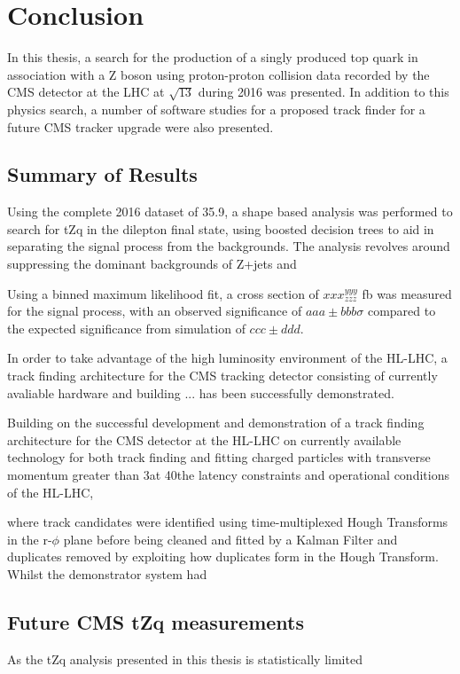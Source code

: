 \chapter{Conclusion}\label{chapter:conclusion}
In this thesis, a search for the production of a singly produced top quark in association with a Z boson using proton-proton collision data recorded by the CMS detector at the LHC at $\sqrt{13}$ during 2016 was presented.
In addition to this physics search, a number of software studies for a proposed track finder for a future CMS tracker upgrade were also presented.

\section{Summary of Results}
Using the complete 2016 dataset of 35.9\fbinv, a shape based analysis was performed to search for tZq in the dilepton final state, using boosted decision trees to aid in separating the signal process from the backgrounds.
The analysis revolves around suppressing the dominant backgrounds of Z+jets and \ttbar

Using a binned maximum likelihood fit, a cross section of $xxx^{yyy}_{zzz}$ fb was measured for the signal process, with an observed significance of $aaa \pm bbb \sigma$ compared to the expected significance from simulation of $ccc \pm ddd$. 



In order to take advantage of the high luminosity environment of the HL-LHC, a track finding architecture for the CMS tracking detector consisting of currently avaliable hardware and building ... has been successfully demonstrated.


Building on the successful development and demonstration of a track finding architecture for the CMS detector at the HL-LHC on currently available technology for both track finding and fitting charged particles with transverse momentum greater than 3\GeV at 40\MHz the latency constraints and operational conditions of the HL-LHC, 


where track candidates were identified using time-multiplexed Hough Transforms in the r-$\phi$ plane before being cleaned and fitted by a Kalman Filter and duplicates removed by exploiting how duplicates form in the Hough Transform. 
Whilst the demonstrator system had 

\section{Future CMS tZq measurements}
As the tZq analysis presented in this thesis is statistically limited

